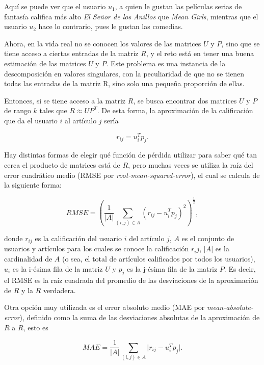 Aquí se puede ver que el usuario $u_1$, a quien le gustan las películas serias de fantasía califica más alto \textit{El Señor de los Anillos} que \textit{Mean Girls}, mientras que el usuario $u_2$ hace lo contrario, pues le gustan las comedias.

Ahora, en la vida real no se conocen los valores de las matrices $U$ y $P$, sino que se tiene acceso a ciertas entradas de la matriz $R$, y el reto está en tener una buena estimación de las matrices $U$ y $P$. Este problema es una instancia de la descomposición en valores singulares, con la peculiaridad de que no se tienen todas las entradas de la matriz R, sino solo una pequeña proporción de ellas.

Entonces, si se tiene acceso a la matriz $R$, se busca encontrar dos matrices $U$ y $P$ de rango $k$ tales que $R \approx U P^T$. De esta forma, la aproximación de la calificación que da el usuario $i$ al artículo $j$ sería

\begin{equation}\label{ec_fact_basico}
r_{ij} = u_i^T p_j.
\end{equation}


Hay distintas formas de elegir qué función de pérdida utilizar para saber qué tan cerca el producto de matrices está de $R$, pero muchas veces se utiliza la raíz del error cuadrático medio (RMSE por \textit{root-mean-squared-error}), el cual se calcula de la siguiente forma:

\begin{equation}
  \label{ec:rmse}
  RMSE = \left ( \frac{1}{\vert A \vert} \sum_{(i,j) \in A} (r_{ij} - u_i^Tp_j )^2 \right ) ^ \frac{1}{2},
\end{equation}

donde $r_{ij}$ es la calificación del usuario $i$ del artículo $j$, $A$ es el conjunto de usuarios y artículos para los cuales se conoce la calificación $r_ij$, $ \vert A \vert$ es la cardinalidad de $A$ (o sea, el total de artículos calificados por todos los usuarios), $u_i$ es la i-ésima fila de la matriz $U$ y $p_j$ es la j-ésima fila de la matriz $P$. Es decir, el RMSE es la raíz cuadrada del promedio de las desviaciones de la aproximación de $R$ y la $R$ verdadera. 

Otra opción muy utilizada es el error absoluto medio (MAE por \textit{mean-absolute-error}), definido como la suma de las desviaciones absolutas de la aproximación de $R$ a $R$, esto es

\[
MAE = \frac{1}{\vert A \vert} \sum_{(i,j) \in A} \vert r_{ij} - u_i^Tp_j \vert.
\]

